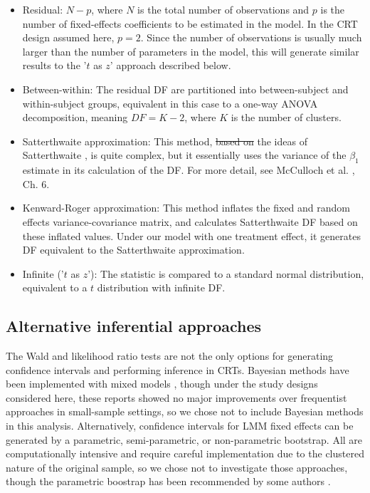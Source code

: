 \documentclass[twocolumn]{bmcart}%
\providecommand{\DIFaddtex}[1]{{\protect\color{blue}\uwave{#1}}} %
\providecommand{\DIFdeltex}[1]{{\protect\color{red}\sout{#1}}}                      %
\providecommand{\DIFaddbegin}{} %
\providecommand{\DIFaddend}{} %
\providecommand{\DIFdelbegin}{} %
\providecommand{\DIFdelend}{} %
\providecommand{\DIFadd}[1]{\texorpdfstring{\DIFaddtex{#1}}{#1}} %
\providecommand{\DIFdel}[1]{\texorpdfstring{\DIFdeltex{#1}}{}} %
\begin{document}
\begin{itemize}
  \item Residual: $N - p$, where $N$ is the total number of observations and $p$ is the number of fixed-effects coefficients to be estimated in the model. In the CRT design assumed here, $p=2$. Since the number of observations is usually much larger than the number of parameters in the model, this will generate similar results to the '$t$ as $z$' approach described below.
  \item Between-within: The residual DF are partitioned into between-subject and within-subject groups, equivalent in this case to a one-way ANOVA decomposition, meaning $DF = K-2$, where $K$ is the number of clusters.
  \item Satterthwaite approximation: This method, \DIFdelbegin \DIFdel{based on }\DIFdelend \DIFaddbegin \DIFadd{generalizing }\DIFaddend the ideas of Satterthwaite \cite{satterthwaite_approximate_1946}, is quite complex, but it essentially uses the variance of the $\beta_1$ estimate in its calculation of the DF. For more detail, see McCulloch et al. \cite{mcculloch_generalized_2008}, Ch. 6.
  \item Kenward-Roger approximation: This method \cite{kenward_small_1997} inflates the fixed and random effects variance-covariance matrix, and calculates Satterthwaite DF based on these inflated values. Under our model with one treatment effect, it generates DF equivalent to the Satterthwaite approximation.
  \item Infinite ('$t$ as $z$'): The statistic is compared to a standard normal distribution, equivalent to a $t$ distribution with infinite DF.
\end{itemize}

\subsection*{Alternative inferential approaches}

The Wald and likelihood ratio tests are not the only options for generating confidence intervals and performing inference in CRTs. Bayesian methods have been implemented with mixed models \cite{browne_comparison_2006, baldwin_bayesian_2013}, though under the study designs considered here, these reports showed no major improvements over frequentist approaches in small-sample settings, so we chose not to include Bayesian methods in this analysis. Alternatively, confidence intervals for LMM fixed effects can be generated by a parametric, semi-parametric, or non-parametric bootstrap. All are computationally intensive and require careful implementation due to the clustered nature of the original sample, so we chose not to investigate those approaches, though the parametric boostrap has been recommended by some authors \cite{ukyo_improved_2019}.
\end{document}
